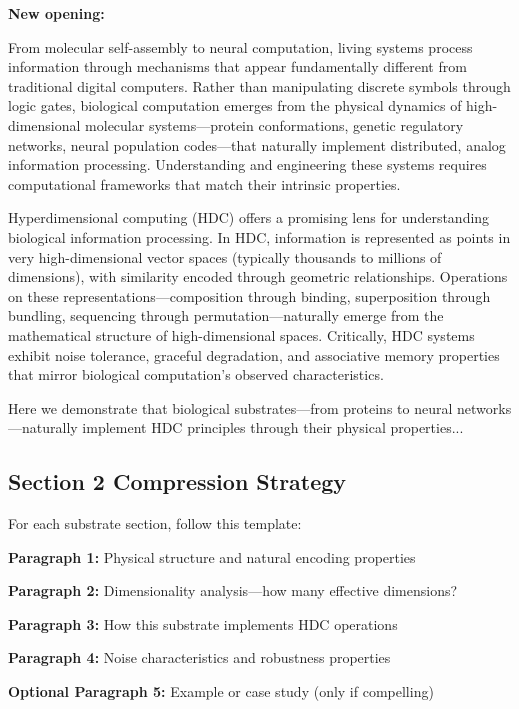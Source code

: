 \documentclass[11pt]{article}
\begin{document}
\textbf{New opening:}
\begin{tcolorbox}[colback=keep!10,colframe=keep]
From molecular self-assembly to neural computation, living systems process information through mechanisms that appear fundamentally different from traditional digital computers. Rather than manipulating discrete symbols through logic gates, biological computation emerges from the physical dynamics of high-dimensional molecular systems—protein conformations, genetic regulatory networks, neural population codes—that naturally implement distributed, analog information processing. Understanding and engineering these systems requires computational frameworks that match their intrinsic properties.

Hyperdimensional computing (HDC) offers a promising lens for understanding biological information processing. In HDC, information is represented as points in very high-dimensional vector spaces (typically thousands to millions of dimensions), with similarity encoded through geometric relationships. Operations on these representations—composition through binding, superposition through bundling, sequencing through permutation—naturally emerge from the mathematical structure of high-dimensional spaces. Critically, HDC systems exhibit noise tolerance, graceful degradation, and associative memory properties that mirror biological computation's observed characteristics.

Here we demonstrate that biological substrates—from proteins to neural networks—naturally implement HDC principles through their physical properties...
\end{tcolorbox}

\subsection{Section 2 Compression Strategy}

For each substrate section, follow this template:

\begin{tcolorbox}[colback=compress!10,colframe=compress,title=Substrate Section Template (300-500 words each)]
\textbf{Paragraph 1:} Physical structure and natural encoding properties

\textbf{Paragraph 2:} Dimensionality analysis—how many effective dimensions?

\textbf{Paragraph 3:} How this substrate implements HDC operations

\textbf{Paragraph 4:} Noise characteristics and robustness properties

\textbf{Optional Paragraph 5:} Example or case study (only if compelling)
\end{tcolorbox}
\end{document}
